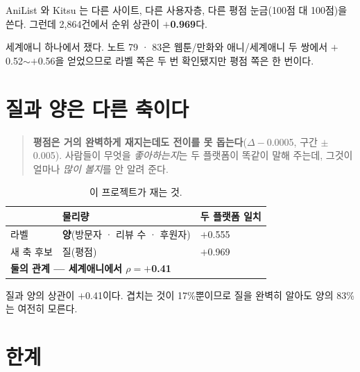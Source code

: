 \documentclass[10pt]{article}
\begin{document}
AniList 와 Kitsu 는 다른 사이트, 다른 사용자층, 다른 평점 눈금(100점 대 100점)을
쓴다. 그런데 2,864건에서 순위 상관이 \textbf{$+$0.969}다.

{세계애니 하나에서 쟀다. 노트 79 · 83은 웹툰/만화와 애니/세계애니 두 쌍에서
$+$0.52$\sim+$0.56을 얻었으므로 라벨 쪽은 두 번 확인됐지만 평점 쪽은
한 번이다.}

\section{질과 양은 다른 축이다}

\begin{quote}\fontsize{9.5}{11.5}\selectfont
\textbf{평점은 거의 완벽하게 재지는데도 전이를 못 돕는다}($\Delta-$0.0005,
구간 $\pm$0.005). 사람들이 무엇을 \emph{좋아하는지}는 두 플랫폼이 똑같이
말해 주는데, 그것이 얼마나 \emph{많이 볼지}를 안 알려 준다.
\end{quote}


\begin{table}[t]
\centering\tsize
\caption{이 프로젝트가 재는 것.}
\begin{tabular}{lll}
\toprule
& 물리량 & 두 플랫폼 일치 \\
\midrule
라벨 & \textbf{양}(방문자 · 리뷰 수 · 후원자) & $+$0.555 \\
새 축 후보 & 질(평점) & $+$0.969 \\
\midrule
\multicolumn{3}{l}{\textbf{둘의 관계 --- 세계애니에서 $\rho{=}+$0.41}} \\
\bottomrule
\end{tabular}
\end{table}

질과 양의 상관이 $+$0.41이다. 겹치는 것이 17\%뿐이므로 질을 완벽히 알아도
양의 83\%는 여전히 모른다.

\section{한계}
\end{document}
